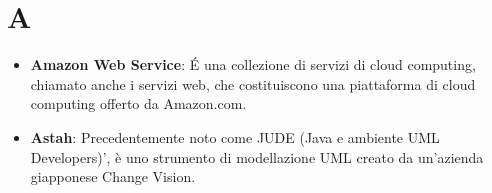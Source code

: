 \section{A}
\begin{itemize}
	\item
	\textbf{Amazon Web Service}: É una collezione di servizi di cloud computing, chiamato anche i servizi web, che costituiscono una piattaforma di cloud computing offerto da Amazon.com.
	\item 
	\textbf{Astah}: Precedentemente noto come JUDE (Java e ambiente UML Developers)', è uno strumento di modellazione UML creato da un'azienda giapponese Change Vision.
\end{itemize}